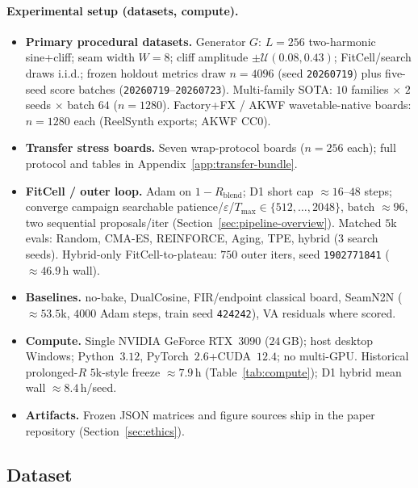 \paragraph{Experimental setup (datasets, compute).}
\begin{itemize}
  \item \textbf{Primary procedural datasets.} Generator $G$: $L{=}256$ two-harmonic sine{+}cliff; seam width $W{=}8$; cliff amplitude $\pm\mathcal{U}(0.08,0.43)$; FitCell/search draws i.i.d.; frozen holdout metrics draw $n{=}4096$ (seed \texttt{20260719}) plus five-seed score batches (\texttt{20260719}--\texttt{20260723}).
    Multi-family SOTA: $10$ families $\times$ $2$ seeds $\times$ batch $64$ ($n{=}1280$).
    Factory+FX / AKWF wavetable-native boards: $n{=}1280$ each (ReelSynth exports; AKWF CC0).
  \item \textbf{Transfer stress boards.} Seven wrap-protocol boards ($n{=}256$ each); full protocol and tables in Appendix~\ref{app:transfer-bundle}.
  \item \textbf{FitCell / outer loop.} Adam on $1-R_{\mathrm{blend}}$; D1 short cap ${\approx}16$--$48$ steps; converge campaign searchable patience/$\varepsilon$/$T_{\max}\!\in\!\{512,\ldots,2048\}$, batch ${\approx}96$, two sequential proposals/iter (Section~\ref{sec:pipeline-overview}).
    Matched $5$k evals: Random, CMA-ES, REINFORCE, Aging, TPE, hybrid (3 search seeds).
    Hybrid-only FitCell-to-plateau: $750$ outer iters, seed \texttt{1902771841} (${\approx}46.9$\,h wall).
  \item \textbf{Baselines.} no-bake, DualCosine, FIR/endpoint classical board, SeamN2N (${\approx}53.5$k, $4000$ Adam steps, train seed \texttt{424242}), VA residuals where scored.
  \item \textbf{Compute.} Single NVIDIA GeForce RTX~3090 ($24$\,GB); host desktop Windows; Python~$3.12$, PyTorch~$2.6$+CUDA~$12.4$; no multi-GPU.
    Historical prolonged-$R$ $5$k-style freeze ${\approx}7.9$\,h (Table~\ref{tab:compute}); D1 hybrid mean wall ${\approx}8.4$\,h/seed.
  \item \textbf{Artifacts.} Frozen JSON matrices and figure sources ship in the paper repository (Section~\ref{sec:ethics}).
\end{itemize}

\subsection{Dataset}
\label{sec:dataset}

